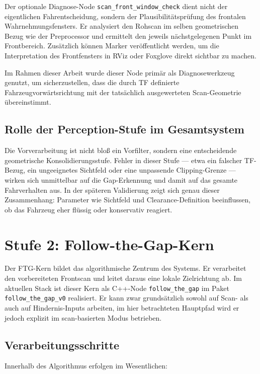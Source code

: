 Der optionale Diagnose-Node \texttt{scan\_front\_window\_check} dient nicht der eigentlichen Fahrentscheidung, sondern der Plausibilitätsprüfung des frontalen Wahrnehmungsfensters. Er analysiert den Rohscan im selben geometrischen Bezug wie der Preprocessor und ermittelt den jeweils nächstgelegenen Punkt im Frontbereich. Zusätzlich können Marker veröffentlicht werden, um die Interpretation des Frontfensters in RViz oder Foxglove direkt sichtbar zu machen.

Im Rahmen dieser Arbeit wurde dieser Node primär als Diagnosewerkzeug genutzt, um sicherzustellen, dass die durch TF definierte Fahrzeugvorwärtsrichtung mit der tatsächlich ausgewerteten Scan-Geometrie übereinstimmt.

\subsection{Rolle der Perception-Stufe im Gesamtsystem}

Die Vorverarbeitung ist nicht bloß ein Vorfilter, sondern eine entscheidende geometrische Konsolidierungsstufe. Fehler in dieser Stufe --- etwa ein falscher TF-Bezug, ein ungeeignetes Sichtfeld oder eine unpassende Clipping-Grenze --- wirken sich unmittelbar auf die Gap-Erkennung und damit auf das gesamte Fahrverhalten aus. In der späteren Validierung zeigt sich genau dieser Zusammenhang: Parameter wie Sichtfeld und Clearance-Definition beeinflussen, ob das Fahrzeug eher flüssig oder konservativ reagiert.

\section{Stufe 2: Follow-the-Gap-Kern}
\label{sec:ftg_core_stage}

Der FTG-Kern bildet das algorithmische Zentrum des Systems. Er verarbeitet den vorbereiteten Frontscan und leitet daraus eine lokale Zielrichtung ab. Im aktuellen Stack ist dieser Kern als C++-Node \texttt{follow\_the\_gap} im Paket \texttt{follow\_the\_gap\_v0} realisiert. Er kann zwar grundsätzlich sowohl auf Scan- als auch auf Hindernis-Inputs arbeiten, im hier betrachteten Hauptpfad wird er jedoch explizit im scan-basierten Modus betrieben.

\subsection{Verarbeitungsschritte}

Innerhalb des Algorithmus erfolgen im Wesentlichen:

